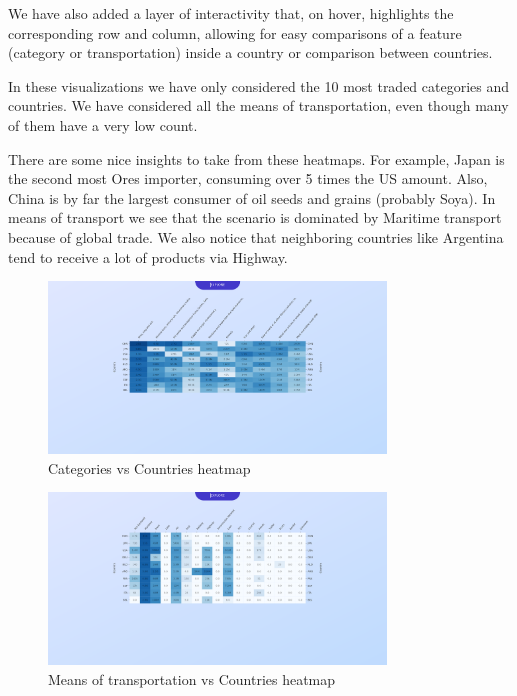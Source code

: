 \documentclass[12pt,a4]{article}
\begin{document}
We have also added a layer of interactivity that, on hover, highlights the corresponding row and column, allowing for easy comparisons of a feature (category or transportation) inside a country or comparison between countries.

In these visualizations we have only considered the 10 most traded categories and countries. We have considered all the means of transportation, even though many of them have a very low count.

There are some nice insights to take from these heatmaps. For example, Japan is the second most Ores importer, consuming over 5 times the US amount. Also, China is by far the largest consumer of oil seeds and grains (probably Soya).  In means of transport we see that the scenario is dominated by Maritime transport because of global trade. We also notice that neighboring countries like Argentina tend to receive a lot of products via Highway.

\begin{figure}[H]
    \centering
    \includegraphics[width=0.8\textwidth]{heatmap1.png}
    \caption{Categories vs Countries heatmap}
\end{figure}

\begin{figure}[H]
    \centering
    \includegraphics[width=0.8\textwidth]{heatmap2.png}
    \caption{Means of transportation vs Countries heatmap}
\end{figure}
\end{document}
